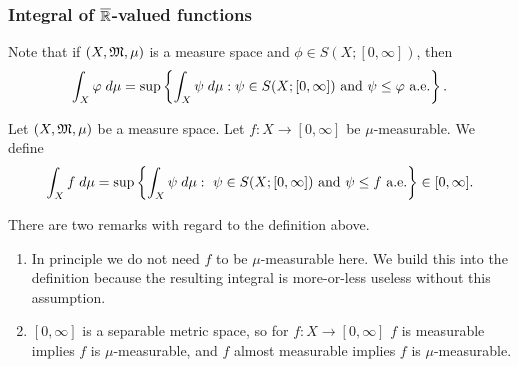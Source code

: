 \documentclass[a4paper]{article}
\begin{document}
\subsubsection*{Integral of $\overline{\mathbb{R}}$-valued functions}

Note that if $(X, \mathfrak{M}, \mu)$ is a measure space and 
$\phi \in S(X; [0, \infty])$, then 
\[
\int_X \varphi \; d\mu = 
\sup \left\{ \int_X \psi \; d\mu : 
\psi \in S(X; [0, \infty]) \text{ and $\psi \leq \varphi$
a.e.} \right\}.
\]

\begin{defi}
  Let $(X, \mathfrak{M}, \mu)$ be a measure space. Let 
  $f : X \to [0, \infty]$ be $\mu$-measurable. We 
  define 
  \[
  \int_X f \; d\mu = 
  \sup \left\{ \int_X \psi \; d\mu: 
  \text{ $\psi \in S(X; [0, \infty])$ and 
  $\psi \leq f$ a.e.} \right\} 
  \in [0, \infty].
  \]
\end{defi}

\begin{remark}
There are two remarks with regard to the definition 
above.
\begin{enumerate}
  \item In principle we do not need $f$ to be $\mu$-measurable
  here. We build this into the definition because the 
  resulting integral is more-or-less useless without this 
  assumption. 
  \item $[0, \infty]$ is a separable metric space,
  so for $f : X \to [0, \infty]$ 
  $f$ is measurable implies $f$ is $\mu$-measurable,
  and $f$ almost measurable implies $f$ is $\mu$-measurable.
\end{enumerate}
\end{remark}
\end{document}
